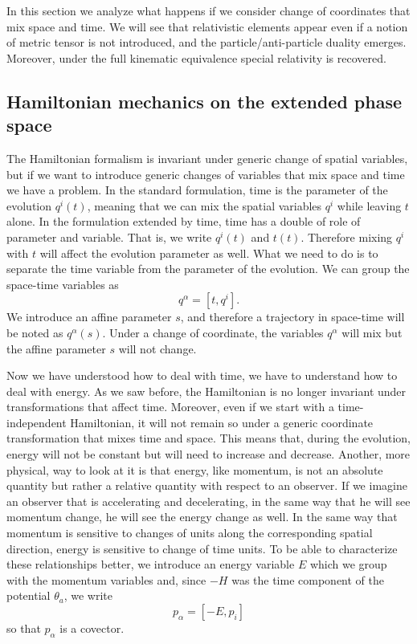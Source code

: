 In this section we analyze what happens if we consider change of coordinates that mix space and time. We will see that relativistic elements appear even if a notion of metric tensor is not introduced, and the particle/anti-particle duality emerges. Moreover, under the full kinematic equivalence special relativity is recovered.

\subsection{Hamiltonian mechanics on the extended phase space}


The Hamiltonian formalism is invariant under generic change of spatial variables, but if we want to introduce generic changes of variables that mix space and time we have a problem. In the standard formulation, time is the parameter of the evolution $q^i(t)$, meaning that we can mix the spatial variables $q^i$ while leaving $t$ alone. In the formulation extended by time, time has a double of role of parameter and variable. That is, we write $q^i(t)$ and $t(t)$. Therefore mixing $q^i$ with $t$ will affect the evolution parameter as well. What we need to do is to separate the time variable from the parameter of the evolution. We can group the space-time variables as
\begin{equation}
	q^\alpha = [t, q^i].
\end{equation}
We introduce an affine parameter $s$, and therefore a trajectory in space-time will be noted as $q^\alpha(s)$. Under a change of coordinate, the variables $q^\alpha$ will mix but the affine parameter $s$ will not change.

Now we have understood how to deal with time, we have to understand how to deal with energy. As we saw before, the Hamiltonian is no longer invariant under transformations that affect time. Moreover, even if we start with a time-independent Hamiltonian, it will not remain so under a generic coordinate transformation that mixes time and space. This means that, during the evolution, energy will not be constant but will need to increase and decrease. Another, more physical, way to look at it is that energy, like momentum, is not an absolute quantity but rather a relative quantity with respect to an observer. If we imagine an observer that is accelerating and decelerating, in the same way that he will see momentum change, he will see the energy change as well. In the same way that momentum is sensitive to changes of units along the corresponding spatial direction, energy is sensitive to change of time units. To be able to characterize these relationships better, we introduce an energy variable $E$ which we group with the momentum variables and, since $-H$ was the time component of the potential $\theta_a$, we write
\begin{equation}
	p_\alpha = [-E, p_i]
\end{equation}
so that $p_\alpha$ is a covector.

